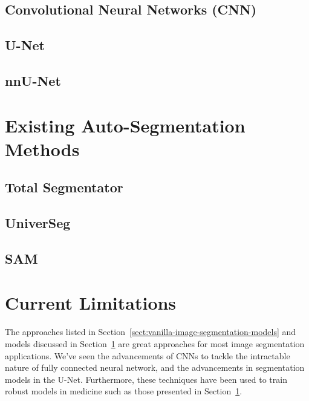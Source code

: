 \documentclass[11pt,twoside]{report}
\begin{document}
\subsection{Convolutional Neural Networks (CNN)}\label{sect:CNNs}

\subsection{U-Net}\label{sect:u-net}

\subsection{nnU-Net}\label{sect:nnu-net}

\section{Existing Auto-Segmentation Methods}\label{sect:existing-auto-segmentation-methods}

\subsection{Total Segmentator}\label{sect:totalseg}

\subsection{UniverSeg}\label{sect:universeg}

\subsection{SAM}\label{sect:sam}

\section{Current Limitations}\label{sect:limitations}

The approaches listed in Section~\ref{sect:vanilla-image-segmentation-models} and models discussed in Section~\ref{sect:existing-auto-segmentation-methods} are great approaches for most image segmentation applications. We've seen the advancements of CNNs to tackle the intractable nature of fully connected neural network, and the advancements in segmentation models in the U-Net. Furthermore, these techniques have been used to train robust models in medicine such as those presented in Section~\ref{sect:existing-auto-segmentation-methods}. 
\end{document}

